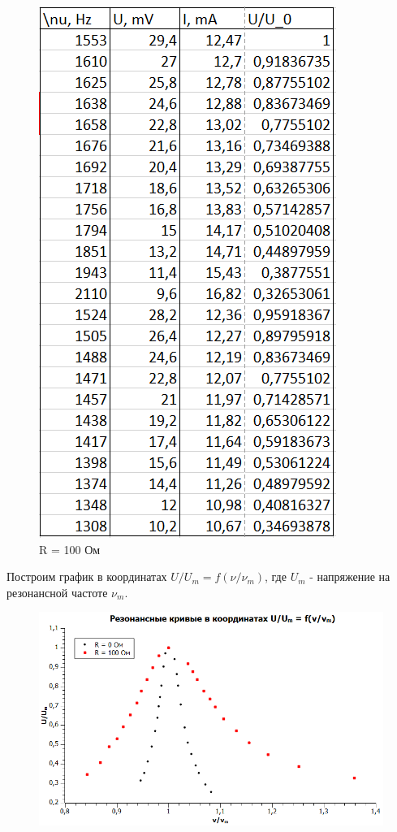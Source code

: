 \documentclass[a4paper, 12pt]{article}%
\begin{document}
\begin{enumerate}
\begin{figure}[h!]
\begin{center}
\begin{minipage}[h!]{0.4\linewidth}
            \includegraphics[scale=1]{table2.png}
            \caption{R = 100 Ом}
            \label{fig:Image1}
        \end{minipage}
    \end{center}
\end{figure}

Построим график в координатах $U/U_m = f(\nu / \nu_m)$, где $U_m$ - напряжение на резонансной частоте $\nu_m$.

\begin{figure}[h!]
\centering
\includegraphics[scale=1]{graph1.png}
\label{fig:Image1}
\end{figure}


\end{enumerate}
\end{document}
